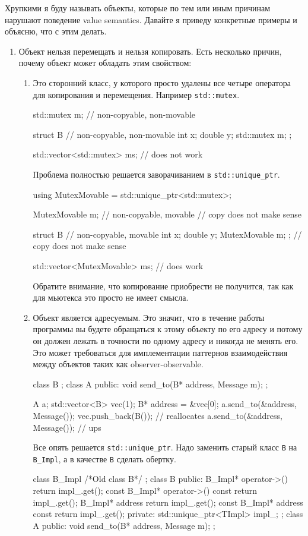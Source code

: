 Хрупкими я буду называть объекты, которые по тем или иным причинам нарушают поведение value semantics.
Давайте я приведу конкретные примеры и объясню, что с этим делать.
\begin{enumerate}
\item\label{section::fragile::nocopymove} Объект нельзя перемещать и нельзя копировать.
Есть несколько причин, почему объект может обладать этим свойством:
\begin{enumerate}
\item Это сторонний класс, у которого просто удалены все четыре оператора для копирования и перемещения.
Например \verb"std::mutex".
\begin{cppcode}
std::mutex m; // non-copyable, non-movable

struct B { // non-copyable, non-movable
  int x;
  double y;
  std::mutex m;
};

std::vector<std::mutex> ms; // does not work
\end{cppcode}
Проблема полностью решается заворачиванием в \verb"std::unique_ptr".
\begin{cppcode}
using MutexMovable = std::unique_ptr<std::mutex>;

MutexMovable m; // non-copyable, movable
// copy does not make sense

struct B { // non-copyable, movable
  int x;
  double y;
  MutexMovable m;
}; // copy does not make sense

std::vector<MutexMovable> ms; // does work
\end{cppcode}
Обратите внимание, что копирование приобрести не получится, так как для мьютекса это просто не имеет смысла.

\item Объект является адресуемым.
Это значит, что в течение работы программы вы будете обращаться к этому объекту по его адресу и потому он должен лежать в точности по одному адресу и никогда не менять его.
Это может требоваться для имплементации паттернов взаимодействия между объектов таких как observer-observable.
\begin{cppcode}
class B {};
class A {
public:
  void send_to(B* address, Message m);
};

A a;
std::vector<B> vec(1);
B* address = &vec[0];
a.send_to(&address, Message());
vec.push_back(B()); // reallocates
a.send_to(&address, Message()); // ups
\end{cppcode}
Все опять решается \verb"std::unique_ptr".
Надо заменить старый класс \verb"B" на \verb"B_Impl", а в качестве \verb"B" сделать обертку.
\begin{cppcode}
class B_Impl { /*Old class B*/ };
class B {
public:
  B_Impl* operator->() {return impl_.get();}
  const B_Impl* operator->() const {return impl_.get();}
  B_Impl* address {return impl_.get();}
  const B_Impl* address const {return impl_.get();}
private:
  std::unique_ptr<TImpl> impl_;
};
class A {
public:
  void send_to(B* address, Message m);
};


\end{cppcode}
\end{enumerate}
\end{enumerate}
